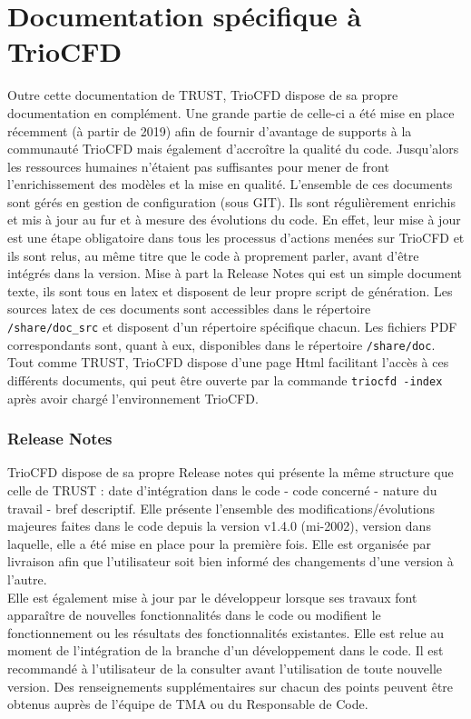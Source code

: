 \chapter{\label{chapitre:doc-trio}Documentation spécifique à TrioCFD}
Outre cette documentation de TRUST, TrioCFD dispose de sa propre documentation en complément. Une grande partie de celle-ci a été mise en place récemment (à partir de 2019) afin de fournir d'avantage de supports à la communauté TrioCFD mais également d'accroître la qualité du code. Jusqu'alors les ressources humaines n'étaient pas suffisantes pour mener de front l'enrichissement des modèles et la mise en qualité. L'ensemble de ces documents sont gérés en gestion de configuration (sous GIT). Ils sont régulièrement enrichis et mis à jour au fur et à mesure des évolutions du code. En effet, leur mise à jour est une étape obligatoire dans tous les processus d'actions menées sur TrioCFD et ils sont relus, au même titre que le code à proprement parler, avant d'être intégrés dans la version. Mise à part la Release Notes qui est un simple document texte, ils sont tous en latex et disposent de leur propre script de génération. Les sources latex de ces documents sont accessibles dans le répertoire \texttt{/share/doc\_src} et disposent d'un répertoire spécifique chacun. Les fichiers PDF correspondants sont, quant à eux, disponibles dans le répertoire \texttt{/share/doc}. Tout comme TRUST, TrioCFD dispose d'une page Html facilitant l'accès à ces différents documents, qui peut être ouverte par la commande \texttt{triocfd -index} après avoir chargé l'environnement TrioCFD.

\subsection{Release Notes}
TrioCFD dispose de sa propre Release notes qui présente la même structure que celle de TRUST : date d'intégration dans le code - code concerné - nature du travail - bref descriptif. Elle présente l'ensemble des modifications/évolutions majeures faites dans le code depuis la version v1.4.0 (mi-2002), version dans laquelle, elle a été mise en place pour la première fois. Elle est organisée par livraison afin que l'utilisateur soit bien informé des changements d'une version à l'autre.\\
Elle est également mise à jour par le développeur lorsque ses travaux font apparaître de nouvelles fonctionnalités dans le code ou modifient le fonctionnement ou les résultats des fonctionnalités existantes. Elle est relue au moment de l'intégration de la branche d'un développement dans le code. Il est recommandé à l'utilisateur de la consulter avant l'utilisation de toute nouvelle version. Des renseignements supplémentaires sur chacun des points peuvent être obtenus auprès de l'équipe de TMA ou du Responsable de Code.

